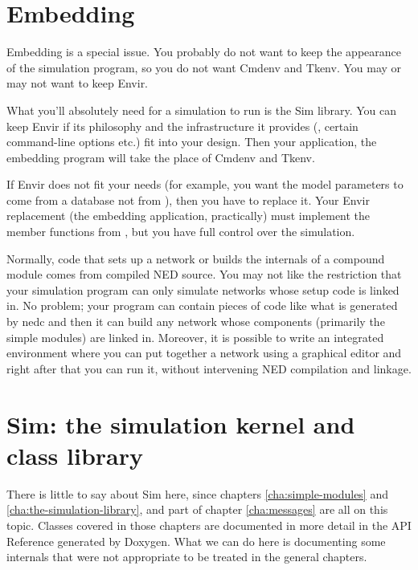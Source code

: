 \section{Embedding {\opp}}
\label{sec:ch-opp-design:embedding}

Embedding is a special issue. You probably
do not want to keep the appearance of the simulation program, so you
do not want Cmdenv and Tkenv. You may or may not want to keep Envir.

What you'll absolutely need for a simulation to run is the Sim
library. You can keep Envir if its philosophy and the infrastructure
it provides (, certain command-line options etc.)
fit into your design. Then your application, the embedding program
will take the place of Cmdenv and Tkenv.

If Envir does not fit your needs (for example, you want the model
parameters to come from a database not from ), then you
have to replace it. Your Envir replacement (the embedding application,
practically) must implement the  member functions from
, but you have full control over the simulation.

Normally, code that sets up a network or builds the internals of a
compound module comes from compiled NED source.  You may not like the
restriction that your simulation program can only simulate networks
whose setup code is linked in. No problem; your program can contain
pieces of code like what is generated by nedc and then it can build
any network whose components (primarily the simple modules) are linked
in. Moreover, it is possible to write an integrated environment where
you can put together a network using a graphical editor and right
after that you can run it, without intervening NED compilation and
linkage.





\section{Sim: the simulation kernel and class library}

There is little to say about Sim here, since chapters
\ref{cha:simple-modules} and \ref{cha:the-simulation-library},
and part of chapter \ref{cha:messages} are all on
this topic. Classes covered in those chapters are documented
in more detail in the API Reference generated by Doxygen.
What we can do here is documenting some internals
that were not appropriate to be treated in the general
chapters.

